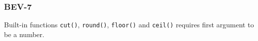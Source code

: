 \subsubsection{BEV-7}\label{sec:error_code_bev_7}

Built-in functions \texttt{cut()}, \texttt{round()}, \texttt{floor()} and \texttt{ceil()} requires first argument to be a number.



